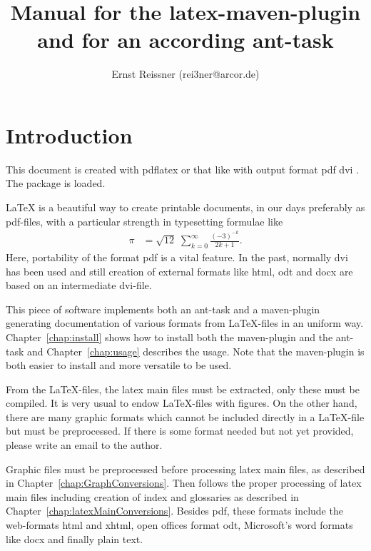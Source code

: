 \documentclass[12pt]{book}
\title{Manual for the latex-maven-plugin and for an according ant-task }
\author{Ernst Reissner (rei3ner@arcor.de)}
\newcommand{\gls}[1]{#1}
\begin{document}
\maketitle

\tableofcontents
\listoffigures
\listoftables


\chapter{Introduction}

This document is created with pdflatex or that like 
with output format 
\ifpdf%
pdf%
\else
dvi%
\fi.
The package  
is  loaded. 

\LaTeX{} is a beautiful way to create printable documents, 
in our days preferably as \gls{pdf}-files, 
with a particular strength in typesetting formulae like 
%
\begin{align}
\pi & = \sqrt{12}\;\sum^\infty_{k=0} \frac{(-3)^{-k}}{2k+1}. %
\end{align}
%
Here, portability of the format \gls{pdf} is a vital feature. 
In the past, normally \gls{dvi} has been used 
and still creation of external formats like \gls{html}, 
\gls{odt} and \gls{docx} are based on an intermediate \gls{dvi}-file. 

This piece of software implements both an ant-task and a maven-plugin 
generating documentation of various formats from \LaTeX-files 
in an uniform way. 
Chapter~\ref{chap:install} shows how to install both the maven-plugin 
and the ant-task 
and Chapter~\ref{chap:usage} describes the usage. 
Note that the maven-plugin is both easier to install 
and more versatile to be used. 

From the \LaTeX-files, the latex main files must be extracted, 
only these must be compiled. 
It is very usual to endow \LaTeX-files with figures. 
On the other hand, there are many graphic formats 
which cannot be included directly in a \LaTeX-file 
but must be preprocessed. 
If there is some format needed but not yet provided, 
please write an email to the author. 

Graphic files must be preprocessed before processing latex main files, 
as described in Chapter~\ref{chap:GraphConversions}. 
Then follows the proper processing of latex main files 
including creation of index and glossaries 
as described in Chapter~\ref{chap:latexMainConversions}. 
Besides \gls{pdf}, these formats include the web-formats \gls{html} 
and \gls{xhtml}, 
open offices format \gls{odt}, Microsoft's word formats like \gls{docx} 
and finally plain text. 
\end{document}
